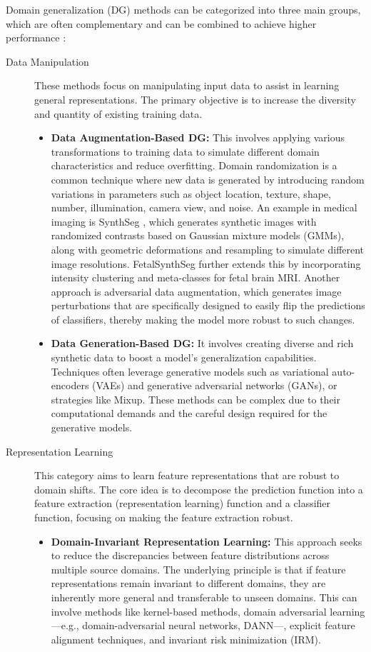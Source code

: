 Domain generalization (DG) methods can be categorized into three main groups, which are often complementary and can be combined to achieve higher performance \cite{Wang2023}:
\begin{description}
    \item[Data Manipulation] These methods focus on manipulating input data to assist in learning general representations. The primary objective is to increase the diversity and quantity of existing training data.
    \begin{itemize}
        \item \textbf{Data Augmentation-Based DG:} This involves applying various transformations to training data  to simulate different domain characteristics and reduce overfitting. Domain randomization is a common technique where new data is generated by introducing random variations in parameters such as object location, texture, shape, number, illumination, camera view, and noise. An example in medical imaging is SynthSeg \cite{Billot2023}, which generates synthetic images with randomized contrasts based on Gaussian mixture models (GMMs), along with geometric deformations and resampling to simulate different image resolutions. FetalSynthSeg \cite{Billot2023} further extends this by incorporating intensity clustering and meta-classes for fetal brain MRI. Another approach is adversarial data augmentation, which generates image perturbations that are specifically designed to easily flip the predictions of classifiers, thereby making the model more robust to such changes.
        \item \textbf{Data Generation-Based DG:} It involves creating diverse and rich synthetic data to boost a model's generalization capabilities. Techniques often leverage generative models such as variational auto-encoders (VAEs) and generative adversarial networks (GANs), or strategies like Mixup. These methods can be complex due to their computational demands and the careful design required for the generative models.
    \end{itemize}
    \item[Representation Learning] This category aims to learn feature representations that are robust to domain shifts. The core idea is to decompose the prediction function into a feature extraction (representation learning) function and a classifier function, focusing on making the feature extraction robust.
    \begin{itemize}
        \item \textbf{Domain-Invariant Representation Learning:} This approach seeks to reduce the discrepancies between feature distributions across multiple source domains. The underlying principle is that if feature representations remain invariant to different domains, they are inherently more general and transferable to unseen domains. This can involve methods like kernel-based methods, domain adversarial learning---e.g., domain-adversarial neural networks, DANN---, explicit feature alignment techniques, and invariant risk minimization (IRM).

\end{itemize}
\end{description}
